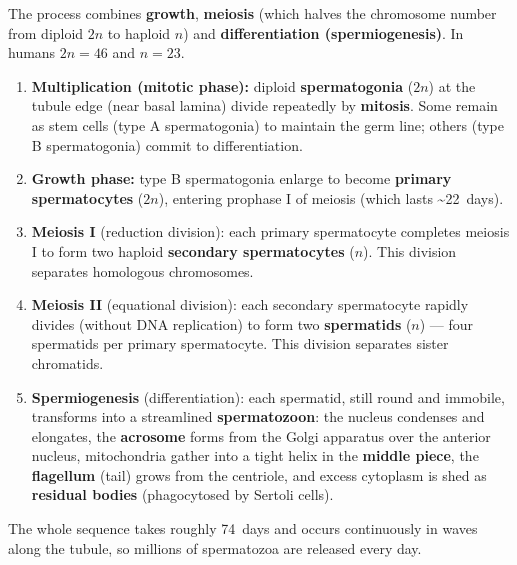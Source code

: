 \documentclass[11pt]{article}
\begin{document}
The process combines \textbf{growth}, \textbf{meiosis} (which halves the chromosome number from diploid $2n$ to haploid $n$) and \textbf{differentiation (spermiogenesis)}. In humans $2n = 46$ and $n = 23$.

\begin{methode}
\begin{enumerate}
\item \textbf{Multiplication (mitotic phase):} diploid \textbf{spermatogonia} ($2n$) at the tubule edge (near basal lamina) divide repeatedly by \textbf{mitosis}. Some remain as stem cells (type A spermatogonia) to maintain the germ line; others (type B spermatogonia) commit to differentiation.
\item \textbf{Growth phase:} type B spermatogonia enlarge to become \textbf{primary spermatocytes} ($2n$), entering prophase I of meiosis (which lasts \textasciitilde\SI{22}{days}).
\item \textbf{Meiosis I} (reduction division): each primary spermatocyte completes meiosis I to form two haploid \textbf{secondary spermatocytes} ($n$). This division separates homologous chromosomes.
\item \textbf{Meiosis II} (equational division): each secondary spermatocyte rapidly divides (without DNA replication) to form two \textbf{spermatids} ($n$) — four spermatids per primary spermatocyte. This division separates sister chromatids.
\item \textbf{Spermiogenesis} (differentiation): each spermatid, still round and immobile, transforms into a streamlined \textbf{spermatozoon}: the nucleus condenses and elongates, the \textbf{acrosome} forms from the Golgi apparatus over the anterior nucleus, mitochondria gather into a tight helix in the \textbf{middle piece}, the \textbf{flagellum} (tail) grows from the centriole, and excess cytoplasm is shed as \textbf{residual bodies} (phagocytosed by Sertoli cells).
\end{enumerate}
The whole sequence takes roughly \SI{74}{days} and occurs continuously in waves along the tubule, so millions of spermatozoa are released every day.
\end{methode}
\end{document}
